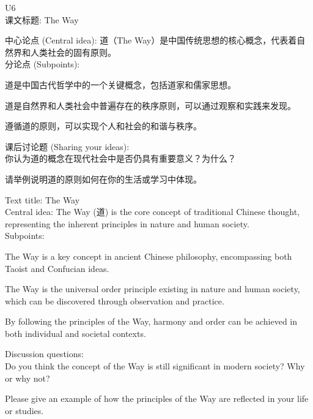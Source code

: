 \documentclass[a4paper,UTF8]{article}
\begin{document}
U6\\

课文标题: The Way

中心论点 (Central idea): 道（The Way）是中国传统思想的核心概念，代表着自然界和人类社会的固有原则。\\

分论点 (Subpoints):

道是中国古代哲学中的一个关键概念，包括道家和儒家思想。

道是自然界和人类社会中普遍存在的秩序原则，可以通过观察和实践来发现。

遵循道的原则，可以实现个人和社会的和谐与秩序。

课后讨论题 (Sharing your ideas):\\

你认为道的概念在现代社会中是否仍具有重要意义？为什么？

请举例说明道的原则如何在你的生活或学习中体现。

Text title: The Way\\

Central idea: The Way (道) is the core concept of traditional Chinese thought, representing the inherent principles in nature and human society.\\

Subpoints:

The Way is a key concept in ancient Chinese philosophy, encompassing both Taoist and Confucian ideas.

The Way is the universal order principle existing in nature and human society, which can be discovered through observation and practice.

By following the principles of the Way, harmony and order can be achieved in both individual and societal contexts.

Discussion questions:\\

Do you think the concept of the Way is still significant in modern society? Why or why not?

Please give an example of how the principles of the Way are reflected in your life or studies.\\
\end{document}
